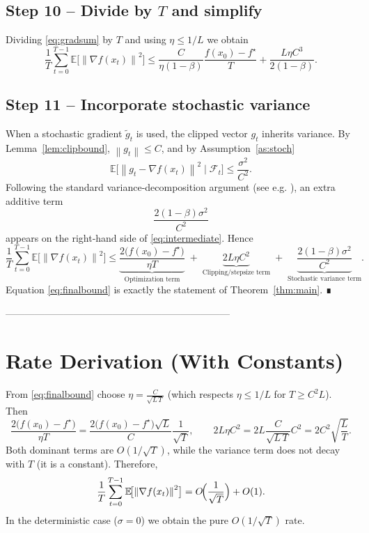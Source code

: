 \documentclass{article}
\newcommand{\E}{\mathbb{E}}
\newcommand{\norm}[1]{\left\lVert#1\right\rVert}
\begin{document}
\subsection*{Step 10 – Divide by $T$ and simplify}
Dividing \eqref{eq:gradsum} by $T$ and using $\eta\le 1/L$ we obtain
\[
\frac{1}{T}\sum_{t=0}^{T-1}\E\!\bigl[\norm{\nabla f(x_{t})}^{2}\bigr]
\le
\frac{C}{\eta(1-\beta)}\frac{f(x_{0})-f^{\star}}{T}
+ \frac{L\eta C^{3}}{2(1-\beta)} .
\tag{10}\label{eq:intermediate}
\]

\subsection*{Step 11 – Incorporate stochastic variance}
When a stochastic gradient $\tilde g_{t}$ is used, the clipped vector $g_{t}$ inherits variance.  By Lemma~\ref{lem:clipbound}, $\norm{g_{t}}\le C$, and by Assumption~\ref{as:stoch}
\[
\E\!\bigl[\norm{g_{t}-\nabla f(x_{t})}^{2}\mid\mathcal{F}_{t}\bigr]\le \frac{\sigma^{2}}{C^{2}}.
\]
Following the standard variance‑decomposition argument (see e.g. \cite{SGD}), an extra additive term
\[
\frac{2(1-\beta)\sigma^{2}}{C^{2}}
\]
appears on the right‑hand side of \eqref{eq:intermediate}.  Hence
\[
\frac{1}{T}\sum_{t=0}^{T-1}\E\!\bigl[\norm{\nabla f(x_{t})}^{2}\bigr]
\le
\underbrace{\frac{2\bigl(f(x_{0})-f^{\star}\bigr)}{\eta T}}_{\text{Optimization term}}
\;+\;
\underbrace{2L\eta C^{2}}_{\text{Clipping/stepsize term}}
\;+\;
\underbrace{\frac{2(1-\beta)\sigma^{2}}{C^{2}}}_{\text{Stochastic variance term}} .
\tag{11}\label{eq:finalbound}
\]
Equation \eqref{eq:finalbound} is exactly the statement of Theorem~\ref{thm:main}. ∎

---------------------------------------------------------------------

\section*{Rate Derivation (With Constants)}
From \eqref{eq:finalbound} choose $\eta = \frac{C}{\sqrt{L\,T}}$ (which respects $\eta\le 1/L$ for $T\ge C^{2}L$).  Then
\[
\frac{2\bigl(f(x_{0})-f^{\star}\bigr)}{\eta T}
= \frac{2\bigl(f(x_{0})-f^{\star}\bigr)\sqrt{L}}{C}\frac{1}{\sqrt{T}},
\qquad
2L\eta C^{2}=2L\frac{C}{\sqrt{L\,T}}C^{2}=2C^{2}\sqrt{\frac{L}{T}}.
\]
Both dominant terms are $O(1/\sqrt{T})$, while the variance term does not decay with $T$ (it is a constant).  Therefore,
\[
\frac{1}{T}\sum_{t=0}^{T-1}\E\!\bigl[\norm{\nabla f(x_{t})}^{2}\bigr]
= O\!\Bigl(\frac{1}{\sqrt{T}}\Bigr)+O(1).
\]
In the deterministic case ($\sigma=0$) we obtain the pure $O(1/\sqrt{T})$ rate.
\end{document}
